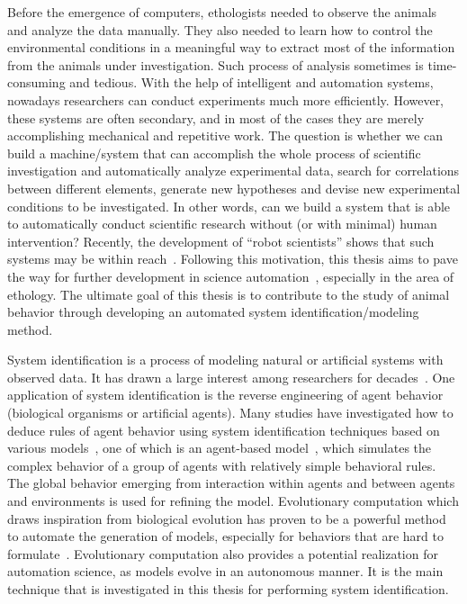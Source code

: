 Before the emergence of computers, ethologists needed to observe the animals and analyze the data manually. They also needed to learn how to control the environmental conditions in a meaningful way to extract most of the information from the animals under investigation. Such process of analysis sometimes is time-consuming and tedious. With the help of intelligent and automation systems, nowadays researchers can conduct experiments much more efficiently. However, these systems are often secondary, and in most of the cases they are merely accomplishing mechanical and repetitive work. The question is whether we can build a machine/system that can accomplish the whole process of scientific investigation and automatically analyze experimental data, search for correlations between different elements, generate new hypotheses and devise new experimental conditions to be investigated. In other words, can we build a system that is able to automatically conduct scientific research without (or with minimal) human intervention? Recently, the development of ``robot scientists'' shows that such systems may be within reach~\cite{King_2009, Evans_2010, Waltz2010}. Following this motivation, this thesis aims to pave the way for further development in science automation~\cite{Evans_2010}, especially in the area of ethology. The ultimate goal of this thesis is to contribute to the study of animal behavior through developing an automated system identification/modeling method.

System identification is a process of modeling natural or artificial systems with observed data. It has drawn a large interest among researchers for decades~\cite{Ljung2010, Billings2013}. One application of system identification is the reverse engineering of agent behavior (biological organisms or artificial agents). Many studies have investigated how to deduce rules of agent behavior using system identification techniques based on various models~\cite{Shandelle2010}, one of which is an agent-based model~\cite{Bonabeau2002}, which simulates the complex behavior of a group of agents with relatively simple behavioral rules. The global behavior emerging from interaction within agents and between agents and environments is used for refining the model. Evolutionary computation which draws inspiration from biological evolution has proven to be a powerful method to automate the generation of models, especially for behaviors that are hard to formulate~\cite{Bongard2005_tevc, Bongard2007PNAS, Ruxton2008}. Evolutionary computation also provides a potential realization for automation science, as models evolve in an autonomous manner. It is the main technique that is investigated in this thesis for performing system identification.

